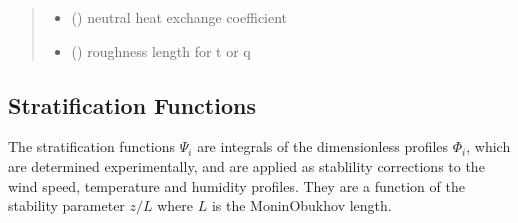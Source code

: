 \documentclass[letterpaper,10pt,english]{sphinxmanual}
\begin{document}
\begin{fulllineitems}
\begin{quote}
\begin{description}
\begin{itemize}
\end{itemize}

\sphinxAtStartPar
\begin{itemize}
\item {} 
\sphinxAtStartPar
{} () \textendash{} neutral heat exchange coefficient

\item {} 
\sphinxAtStartPar
{} () \textendash{} roughness length for t or q

\end{itemize}


\end{description}\end{quote}

\end{fulllineitems}



\subsection{Stratification Functions}
\label{\detokenize{users_guide:module-AirSeaFluxCode.flux_subs.stratification}}\label{\detokenize{users_guide:stratification-functions}}
\sphinxAtStartPar
The stratification functions \(\Psi_i\) are integrals of the dimensionless profiles \(\Phi_i\), which are determined experimentally, and are applied as stablility corrections to the wind speed, temperature and humidity profiles.
They are a function of the stability parameter \(z/L\) where \(L\) is the Monin\sphinxhyphen{}Obukhov length.
\end{document}
